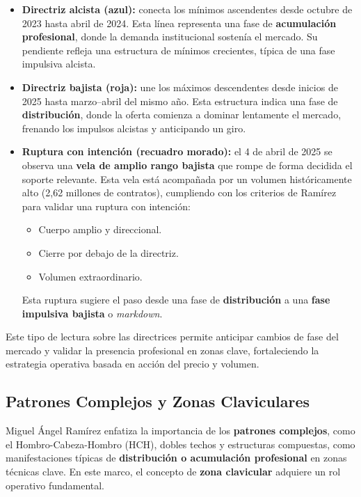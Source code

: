 \begin{itemize}
    \item \textbf{Directriz alcista (azul):} conecta los m\'inimos ascendentes desde octubre de 2023 hasta abril de 2024. Esta l\'inea representa una fase de \textbf{acumulaci\'on profesional}, donde la demanda institucional sosten\'ia el mercado. Su pendiente refleja una estructura de m\'inimos crecientes, t\'ipica de una fase impulsiva alcista.
    
    \item \textbf{Directriz bajista (roja):} une los m\'aximos descendentes desde inicios de 2025 hasta marzo–abril del mismo a\~no. Esta estructura indica una fase de \textbf{distribuci\'on}, donde la oferta comienza a dominar lentamente el mercado, frenando los impulsos alcistas y anticipando un giro.
    
    \item \textbf{Ruptura con intenci\'on (recuadro morado):} el 4 de abril de 2025 se observa una \textbf{vela de amplio rango bajista} que rompe de forma decidida el soporte relevante. Esta vela est\'a acompa\~nada por un volumen hist\'oricamente alto (2{,}62 millones de contratos), cumpliendo con los criterios de Ram\'irez para validar una ruptura con intenci\'on:
    \begin{itemize}
        \item Cuerpo amplio y direccional.
        \item Cierre por debajo de la directriz.
        \item Volumen extraordinario.
    \end{itemize}
    Esta ruptura sugiere el paso desde una fase de \textbf{distribuci\'on} a una \textbf{fase impulsiva bajista} o \textit{markdown}.
\end{itemize}

\vspace{1em}
\noindent
Este tipo de lectura sobre las directrices permite anticipar cambios de fase del mercado y validar la presencia profesional en zonas clave, fortaleciendo la estrategia operativa basada en acci\'on del precio y volumen.


\subsection{Patrones Complejos y Zonas Claviculares}

Miguel \'Angel Ram\'irez enfatiza la importancia de los \textbf{patrones complejos}, como el Hombro-Cabeza-Hombro (HCH), dobles techos y estructuras compuestas, como manifestaciones t\'ipicas de \textbf{distribuci\'on o acumulaci\'on profesional} en zonas t\'ecnicas clave. En este marco, el concepto de \textbf{zona clavicular} adquiere un rol operativo fundamental.

